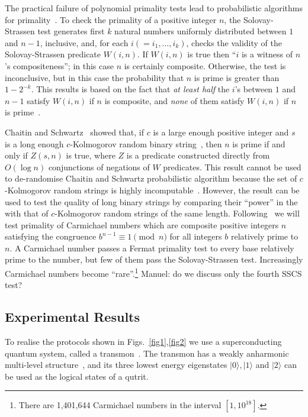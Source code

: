\documentclass[11pt,a4paper]{article}
\begin{document}
The practical failure of polynomial primality tests lead to probabilistic algorithms for primality~\cite{miller_prob_primality,rabin_prob_primality,solovay:84,solovay:118,Stiglic2011,Stiglic2011}.
To check the primality of  a positive integer $n$,  the Solovay-Strassen test generates first $k$ natural numbers uniformly distributed between $1$ and $n -
1$, inclusive, and, for each $i(=i_1,\dots,i_k)$, checks the validity of the Solovay-Strassen
predicate $W(i, n)$.  If $W(i,
n)$ is true then ``$i$ is a witness of $n$'s compositeness''; in this case $n$ is certainly composite.
Otherwise, the test is inconclusive, but in this case the probability that $n$
is prime is greater than $1-2^{-k}$.  This results is based on the fact that {\it at
least half} the $i$'s between $1$ and $n - 1$ satisfy $W(i, n)$ if $n$ is
composite, and \emph{none} of them satisfy $W(i, n)$ if $n$ is
prime~\cite{Solovay77}.

Chaitin and Schwartz~\cite{Chaitin78} showed that, if  $c$ is a large enough positive integer and  $s$ is a long enough
$c$-Kolmogorov random binary string~\cite{calude:02}, then $n$ is prime if and only if  $Z(s,n)$ is true,
where $Z$ is a predicate constructed directly from $O(\log n)$ conjunctions of
negations of $W$ predicates.  This result cannot be used to de-randomise Chaitin and Schwartz probabilistic algorithm
because the set of $c$-Kolmogorov random
strings is highly incomputable~\cite{calude:02}. However, the result can be used to test the quality of long binary strings by comparing their ``power'' in the with that of $c$-Kolmogorov random strings of the same length. Following~\cite{Abbott_2019} we will test primality of  Carmichael numbers which are  composite positive integers $n$ satisfying the congruence $b^{n-1} \equiv 1
\pmod n$ for all integers $b$ relatively prime to $n$.
A Carmichael number  passes a Fermat primality test to every base  relatively prime to the number, but few of them  pass the Solovay-Strassen test. Increasingly
Carmichael numbers become ``rare''.\footnote{There are 1,401,644 Carmichael
numbers in the interval $[1, 10^{18}]$.} {\color{red} Manuel: do we discuss only the fourth SSCS test?}

\subsection{Experimental Results}
To realise the protocols shown in  Figs.~\ref{fig1},\ref{fig2} we use a superconducting quantum system, called a transmon~\cite{PhysRevLett.119.240501}. The transmon has a weakly anharmonic multi-level structure~\cite{Koch2007}, and its three lowest energy eigenstates $|0\rangle, |1\rangle$ and $|2\rangle$ can be used as the logical states of a qutrit.
\end{document}
